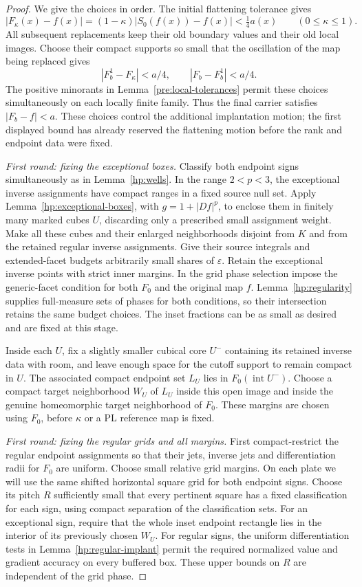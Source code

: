 \documentclass[11pt]{article}
\numberwithin{equation}{section}
\theoremstyle{definition}
\theoremstyle{remark}
\newcommand{\eps}{\varepsilon}
\DeclareMathOperator{\interior}{int}
\begin{document}
\begin{proof}
We give the choices in order.  The initial flattening tolerance gives
\[
 |F_\kappa(x)-f(x)|
   =(1-\kappa)|S_0(f(x))-f(x)|<\tfrac14a(x)
       \qquad(0\leq\kappa\leq1).
\]
All subsequent replacements keep their old boundary values and their
old local images.  Choose their compact supports so small that the
oscillation of the map being replaced gives
\[
 |F_b^1-F_\kappa|<a/4,
 \qquad |F_b-F_b^1|<a/4.
\]
The positive minorants in Lemma~\ref{pre:local-tolerances} permit these
choices simultaneously on each locally finite family.  Thus the final
carrier satisfies $|F_b-f|<a$.  These choices control the additional
implantation motion; the first displayed bound has already reserved
the flattening motion before the rank and endpoint data were fixed.

\emph{First round: fixing the exceptional boxes.}
Classify both endpoint signs simultaneously as in
Lemma~\ref{hp:wells}.  In the range $2<p<3$, the exceptional inverse
assignments have compact ranges in a fixed source null set.  Apply
Lemma~\ref{hp:exceptional-boxes}, with $g=1+|Df|^p$, to enclose them
in finitely many marked cubes $U$, discarding only a prescribed
small assignment weight.  Make all these cubes and their enlarged
neighborhoods disjoint from $K$ and from the retained regular inverse
assignments.  Give their source integrals and extended-facet budgets
arbitrarily small shares of $\eps$.  Retain the exceptional inverse
points with strict inner margins.  In the grid phase selection impose
the generic-facet condition for both $F_0$ and the original map $f$.
Lemma~\ref{hp:regularity} supplies full-measure sets of phases for
both conditions, so their intersection retains the same budget choices.
The inset fractions can be as small as desired and are fixed at this
stage.

Inside each $U$, fix a slightly smaller cubical core $U^-$ containing
its retained inverse data with room, and leave enough space for the
cutoff support to remain compact in $U$.  The associated compact
endpoint set $L_U$ lies in $F_0(\interior U^-)$.  Choose a compact
target neighborhood $W_U$ of $L_U$ inside this open image and inside
the genuine homeomorphic target neighborhood of $F_0$.  These margins
are chosen using $F_0$, before $\kappa$ or a PL reference map is fixed.

\emph{First round: fixing the regular grids and all margins.}
First compact-restrict the regular endpoint assignments so that their
jets, inverse jets and differentiation radii for $F_0$ are uniform.
Choose small relative grid margins.  On each plate we will use the
same shifted horizontal square grid for both endpoint signs.  Choose
its pitch $R$ sufficiently small that every pertinent square has a
fixed classification for each sign, using compact separation of the
classification sets.  For an exceptional sign, require that the whole
inset endpoint rectangle lies in the interior of its previously
chosen $W_U$.  For regular signs, the uniform differentiation tests
in Lemma~\ref{hp:regular-implant} permit the required normalized value
and gradient accuracy on every buffered box.  These upper bounds on
$R$ are independent of the grid phase.


\end{proof}
\end{document}
